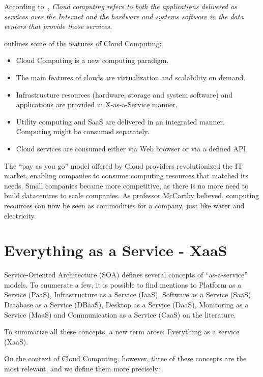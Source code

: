 According to~\cite{AViewOfCloudComputing}, \textit{Cloud computing refers to both the applications delivered as services over the Internet and the hardware and systems software in the data centers that provide those services.} 

\cite{stanoevskaslabeva2009grid} outlines some of the features of Cloud Computing:

\begin{itemize}
   \item{Cloud Computing is a new computing paradigm.}
   \item{The main features of clouds are virtualization and scalability on demand.}

   \item{Infrastructure resources (hardware, storage and system software) and applications
        are provided in X-as-a-Service manner.}
   \item{Utility computing and SaaS are delivered in an integrated manner. Computing might be consumed separately.}
   \item{Cloud services are consumed either via Web browser or via a defined API.}
\end{itemize}


The ``pay as you go'' model offered by Cloud providers revolutionized the IT market, enabling companies to consume computing resources that matched its needs. Small companies became more competitive, as there is no more need to build datacentres to scale companies. As professor McCarthy believed, computing resources can now be seen as commodities for a company, just like water and electricity.  

\section{Everything as a Service - XaaS}

Service-Oriented Architecture (SOA) defines several concepts of ``as-a-service'' models. To enumerate a few, it is possible to find mentions to Platform as a Service (PaaS), Infrastructure as a Service (IaaS), Software as a Service (SaaS), Database as a Service (DBaaS), Desktop as a Service (DaaS), Monitoring as a Service (MaaS) and Communication as a Service (CaaS) on the literature. 

To summarize all these concepts, a new term arose: Everything as a service (XaaS)\cite{7214098}\cite{Armbrust09m.:above}.

On the context of Cloud Computing, however, three of these concepts are the most relevant, and we define them more precisely:

